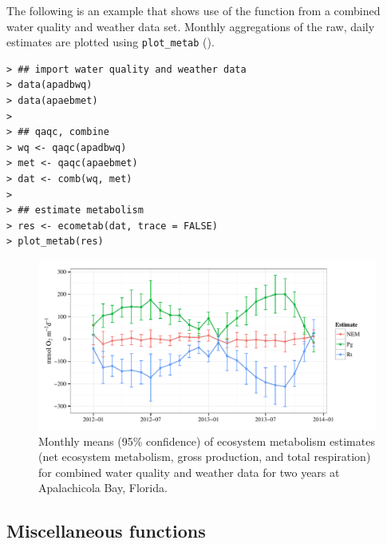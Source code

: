 \documentclass[10pt,letterpaper]{article}\usepackage[]{graphicx}\usepackage[]{color}
\makeatletter
\def\maxwidth{ %
  \ifdim\Gin@nat@width>\linewidth
    \linewidth
  \else
    \Gin@nat@width
  \fi
}
\newenvironment{kframe}{%
 \def\at@end@of@kframe{}%
 \ifinner\ifhmode%
  \def\at@end@of@kframe{\end{minipage}}%
  \begin{minipage}{\columnwidth}%
 \fi\fi%
 \def\FrameCommand##1{\hskip\@totalleftmargin \hskip-\fboxsep
 \colorbox{shadecolor}{##1}\hskip-\fboxsep
     \hskip-\linewidth \hskip-\@totalleftmargin \hskip\columnwidth}%
 \MakeFramed {\advance\hsize-\width
   \@totalleftmargin\z@ \linewidth\hsize
   \@setminipage}}%
 {\par\unskip\endMakeFramed%
 \at@end@of@kframe}
\newenvironment{knitrout}{}{} %
\makeatother
\begin{document}
The following is an example that shows use of the function from a combined water quality and weather data set.  Monthly aggregations of the raw, daily estimates are plotted using \texttt{plot\_metab} ().

\begin{knitrout}\small
{}\color{fgcolor}\begin{kframe}
\begin{verbatim}
> ## import water quality and weather data
> data(apadbwq)
> data(apaebmet)
> 
> ## qaqc, combine
> wq <- qaqc(apadbwq)
> met <- qaqc(apaebmet)
> dat <- comb(wq, met)
> 
> ## estimate metabolism
> res <- ecometab(dat, trace = FALSE)
> plot_metab(res)
\end{verbatim}
\end{kframe}\begin{figure}[!ht]


{\centering \includegraphics[width=\maxwidth]{figure/metab_ex} 

}

\caption[Monthly means (95\% confidence) of ecosystem metabolism estimates (net ecosystem metabolism, gross production, and total respiration) for combined water quality and weather data for two years at Apalachicola Bay, Florida]{Monthly means (95\% confidence) of ecosystem metabolism estimates (net ecosystem metabolism, gross production, and total respiration) for combined water quality and weather data for two years at Apalachicola Bay, Florida.\label{fig:metab_ex}}
\end{figure}


\end{knitrout}

\subsection*{Miscellaneous functions}
\end{document}
